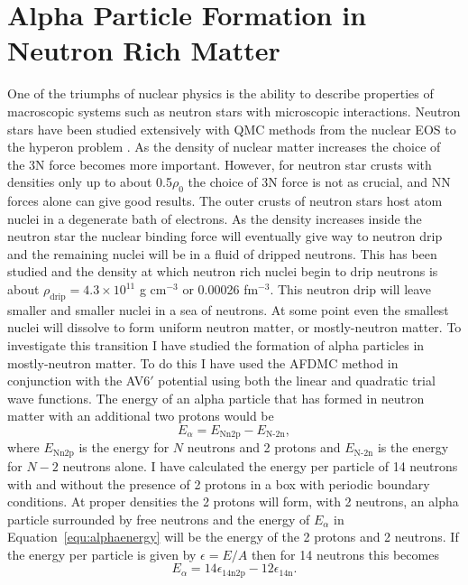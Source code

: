 \section{Alpha Particle Formation in Neutron Rich Matter}
One of the triumphs of nuclear physics is the ability to describe properties of macroscopic systems such as neutron stars with microscopic interactions. Neutron stars have been studied extensively with QMC methods from the nuclear EOS \cite{sarsa2003,gandolfi2014} to the hyperon problem \cite{lonardoni2015,gandolfi2018}. As the density of nuclear matter increases the choice of the 3N force becomes more important. However, for neutron star crusts with densities only up to about 0.5$\rho_0$ the choice of 3N force is not as crucial, and NN forces alone can give good results. The outer crusts of neutron stars host atom nuclei in a degenerate bath of electrons. As the density increases inside the neutron star the nuclear binding force will eventually give way to neutron drip and the remaining nuclei will be in a fluid of dripped neutrons. This has been studied \cite{lorenz1993,chamel2015} and the density at which neutron rich nuclei begin to drip neutrons is about $\rho_\text{drip} = 4.3\times10^{11}$ g cm$^{-3}$ or 0.00026 fm$^{-3}$. This neutron drip will leave smaller and smaller nuclei in a sea of neutrons. At some point even the smallest nuclei will dissolve to form uniform neutron matter, or mostly-neutron matter. To investigate this transition I have studied the formation of alpha particles in mostly-neutron matter. To do this I have used the AFDMC method in conjunction with the AV6$'$ potential using both the linear and quadratic trial wave functions. The energy of an alpha particle that has formed in neutron matter with an additional two protons would be
\begin{equation}
   E_\alpha = E_\text{Nn2p} - E_\text{N-2n},
   \label{equ:alphaenergy}
\end{equation}
where $E_\text{Nn2p}$ is the energy for $N$ neutrons and 2 protons and $E_\text{N-2n}$ is the energy for $N-2$ neutrons alone. I have calculated the energy per particle of 14 neutrons with and without the presence of 2 protons in a box with periodic boundary conditions. At proper densities the 2 protons will form, with 2 neutrons, an alpha particle surrounded by free neutrons and the energy of $E_\alpha$ in Equation~\ref{equ:alphaenergy} will be the energy of the 2 protons and 2 neutrons. If the energy per particle is given by $\epsilon = E/A$ then for 14 neutrons this becomes
\begin{equation}
   E_\alpha = 14\epsilon_\text{14n2p} - 12\epsilon_\text{14n}.
   \label{equ:alphaenergy14n2p}
\end{equation}

